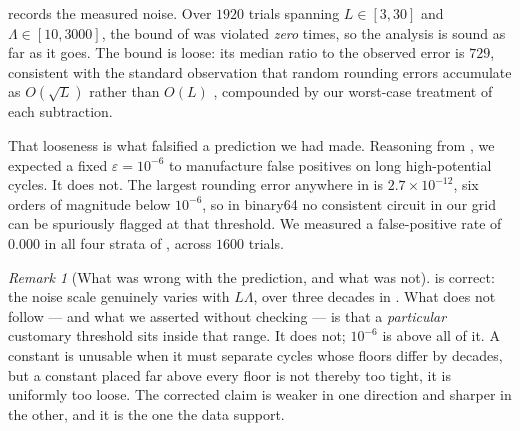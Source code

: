 \documentclass[11pt,twocolumn,a4paper]{article}
\theoremstyle{pstyle}
\theoremstyle{definition}
\theoremstyle{remark}
\newtheorem{remark}[theorem]{Remark}
\newcommand{\eps}{\varepsilon}
\begin{document}
 records the measured noise. Over $1920$ trials spanning
$L\in[3,30]$ and $\Lambda\in[10,3000]$, the bound of
 was violated \emph{zero} times, so the analysis is
sound as far as it goes. The bound is loose: its median ratio to the
observed error is $729$, consistent with the standard observation that
random rounding errors accumulate as $O(\sqrt{L})$ rather than $O(L)$
\citep{higham2002}, compounded by our worst-case treatment of each
subtraction.



That looseness is what falsified a prediction we had made. Reasoning
from , we expected a fixed $\eps=10^{-6}$ to
manufacture false positives on long high-potential cycles. It does not.
The largest rounding error anywhere in  is
$2.7\times10^{-12}$, six orders of magnitude below $10^{-6}$, so in
binary64 no consistent circuit in our grid can be spuriously flagged at
that threshold. We measured a false-positive rate of $0.000$ in all four
strata of , across $1600$ trials.

\begin{remark}[What was wrong with the prediction, and what was not]
\label{rem:prediction-failed}
 is correct: the noise scale genuinely varies with
$L\Lambda$, over three decades in . What does not follow ---
and what we asserted without checking --- is that a \emph{particular}
customary threshold sits inside that range. It does not; $10^{-6}$ is
above all of it. A constant is unusable when it must separate cycles
whose floors differ by decades, but a constant placed far above every
floor is not thereby too tight, it is uniformly too loose. The corrected
claim is weaker in one direction and sharper in the other, and it is the
one the data support.
\end{remark}
\end{document}
